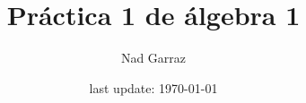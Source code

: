 



 



\pagestyle{empty} %

\title{Práctica 1 de álgebra 1} %
\author{Nad Garraz} %
\date{last update: \today} %


